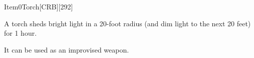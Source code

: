 
\begin{card}{Item}{0}{Torch}[CRB][292]

A torch sheds bright light in a 20-foot radius (and dim light to the next 20 feet) for 1 hour. 

It can be used as an improvised weapon.

{}

\vfill

\end{card}
